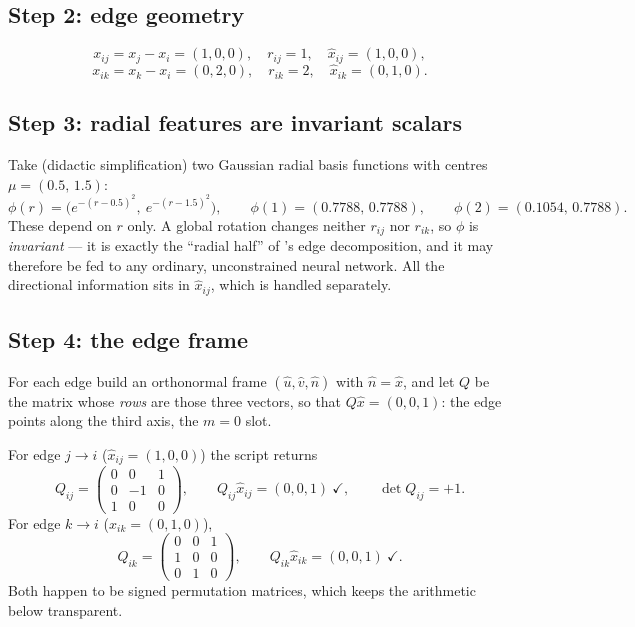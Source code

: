 \documentclass[11pt,a4paper]{report}
\theoremstyle{definition}
\theoremstyle{remark}
\begin{document}
\subsection{Step 2: edge geometry}

\[
x_{ij}=x_j-x_i=(1,0,0),\quad r_{ij}=1,\quad \hat x_{ij}=(1,0,0) ,
\]
\[
x_{ik}=x_k-x_i=(0,2,0),\quad r_{ik}=2,\quad \hat x_{ik}=(0,1,0) .
\]

\subsection{Step 3: radial features are invariant scalars}

Take (didactic simplification) two Gaussian radial basis functions with
centres $\mu=(0.5,\,1.5)$:
\[
\phi(r)=\bigl(e^{-(r-0.5)^2},\ e^{-(r-1.5)^2}\bigr) ,
\qquad
\phi(1)=(0.7788,\,0.7788),
\qquad
\phi(2)=(0.1054,\,0.7788) .
\]
These depend on $r$ only. A global rotation changes neither $r_{ij}$ nor
$r_{ik}$, so $\phi$ is \emph{invariant} --- it is exactly the ``radial half''
of 's edge decomposition, and it may therefore be fed
to any ordinary, unconstrained neural network. All the directional
information sits in $\hat x_{ij}$, which is handled separately.

\subsection{Step 4: the edge frame}

For each edge build an orthonormal frame $(\hat u,\hat v,\hat n)$ with
$\hat n=\hat x$, and let $Q$ be the matrix whose \emph{rows} are those three
vectors, so that $Q\hat x=(0,0,1)$: the edge points along the third axis, the
$m=0$ slot.

For edge $j\to i$ ($\hat x_{ij}=(1,0,0)$) the script returns
\[
Q_{ij}=\begin{pmatrix}0&0&1\\ 0&-1&0\\ 1&0&0\end{pmatrix},
\qquad
Q_{ij}\hat x_{ij}=(0,0,1)\ \checkmark,
\qquad \det Q_{ij}=+1 .
\]
For edge $k\to i$ ($\hat x_{ik}=(0,1,0)$),
\[
Q_{ik}=\begin{pmatrix}0&0&1\\ 1&0&0\\ 0&1&0\end{pmatrix},
\qquad
Q_{ik}\hat x_{ik}=(0,0,1)\ \checkmark .
\]
Both happen to be signed permutation matrices, which keeps the arithmetic
below transparent.
\end{document}
